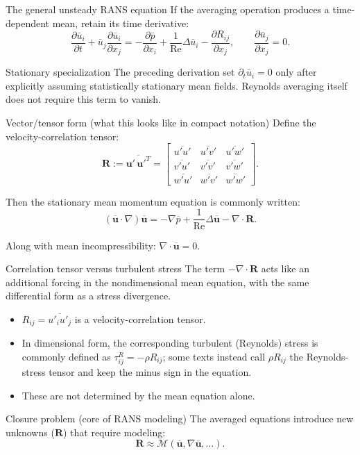 \documentclass[aspectratio=169,11pt]{beamer}
\newcommand{\uu}{\bm{u}}
\newcommand{\Rey}{\mathrm{Re}}
\newcommand{\avg}[1]{\overline{#1}}
\renewcommand{\up}{\uu'} %
\newcommand{\ubar}{\avg{\uu}}
\newcommand{\grad}{\nabla}
\newcommand{\Div}{\nabla\cdot}
\newcommand{\Lap}{\Delta}
\begin{document}
\begin{frame}{The general unsteady RANS equation}
If the averaging operation produces a time-dependent mean, retain its time derivative:
\[
\frac{\partial \bar u_i}{\partial t}
+\bar u_j\frac{\partial \bar u_i}{\partial x_j}
=-\frac{\partial \bar p}{\partial x_i}
+\frac{1}{\Rey}\Delta\bar u_i
-\frac{\partial R_{ij}}{\partial x_j},
\qquad
\frac{\partial \bar u_j}{\partial x_j}=0.
\]

\begin{block}{Stationary specialization}
The preceding derivation set $\partial_t\bar u_i=0$ only after explicitly assuming statistically stationary mean fields. Reynolds averaging itself does not require this term to vanish.
\end{block}
\end{frame}

\begin{frame}{Vector/tensor form (what this looks like in compact notation)}
Define the velocity-correlation tensor:
\[
\bm{R} := \avg{\up\,\up^{T}}
=
\begin{bmatrix}
\avg{u'u'} & \avg{u'v'} & \avg{u'w'}\\
\avg{v'u'} & \avg{v'v'} & \avg{v'w'}\\
\avg{w'u'} & \avg{w'v'} & \avg{w'w'}
\end{bmatrix}.
\]

Then the stationary mean momentum equation is commonly written:
\[
(\ubar\cdot\grad)\ubar
=
-\grad \avg{p}
+\frac{1}{\Rey}\Lap \ubar
-\Div \bm{R}.
\]

Along with mean incompressibility: \;\; $\Div\ubar=0$.
\end{frame}

\begin{frame}{Correlation tensor versus turbulent stress}
The term $-\Div\bm{R}$ acts like an additional forcing in the nondimensional mean equation, with the same differential form as a stress divergence.

\begin{itemize}
  \item $R_{ij}=\avg{u'_i u'_j}$ is a velocity-correlation tensor.
  \item In dimensional form, the corresponding turbulent (Reynolds) stress is commonly defined as $\tau^{R}_{ij}=-\rho R_{ij}$; some texts instead call $\rho R_{ij}$ the Reynolds-stress tensor and keep the minus sign in the equation.
  \item These are not determined by the mean equation alone.
\end{itemize}

\begin{block}{Closure problem (core of RANS modeling)}
The averaged equations introduce new unknowns ($\bm{R}$) that require modeling:
\[
\bm{R} \approx \mathcal{M}(\ubar, \grad \ubar, \ldots).
\]
\end{block}
\end{frame}
\end{document}
